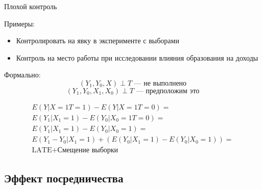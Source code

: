 \begin{frame}{Плохой контроль}

Примеры:
\begin{itemize}
    \item Контролировать на явку в эксперименте с выборами
    \item Контроль на место работы при исследовании влияния образования на доходы
\end{itemize}
    
\pause
    
Формально:
$$(Y_1, Y_0, X) \perp T\text{ --- не выполнено}$$
$$(Y_1, Y_0, X_1, X_0) \perp T\text{ --- предположим это}$$

\begin{gather*}
E(Y|X=1 T=1) - E(Y|X=1 T=0) = \\
E(Y_1|X_1=1) - E(Y_0|X_0=1 T=0) = \\
E(Y_1|X_1=1) - E(Y_0|X_0=1) =
\\E(Y_1 - Y_0|X_1=1) + (E(Y_0|X_1=1) - E(Y_0|X_0=1))= \\
\text{LATE} + \text{Смещение выборки}
\end{gather*}



\end{frame}

\subsection{Эффект посредничества}



